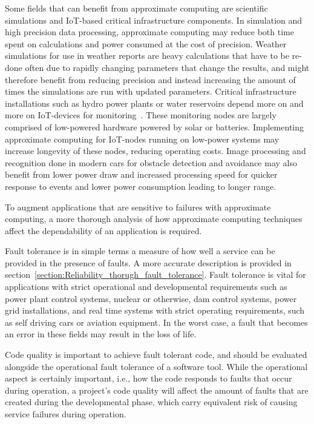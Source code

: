 Some fields that can benefit from approximate computing are scientific simulations and IoT-based critical infrastructure components. In simulation and high precision data processing, approximate computing may reduce both time spent on calculations and power consumed at the cost of precision. Weather simulations for use in weather reports are heavy calculations that have to be re-done often due to rapidly changing parameters that change the results, and might therefore benefit from reducing precision and instead increasing the amount of times the simulations are run with updated parameters. Critical infrastructure installations such as hydro power plants or water reservoirs depend more on and more on IoT-devices for monitoring~\citep{watertight_jaatun}. These monitoring nodes are largely comprised of low-powered hardware powered by solar or batteries. Implementing approximate computing for IoT-nodes running on low-power systems may increase longevity of these nodes, reducing operating costs. Image processing and recognition done in modern cars for obstacle detection and avoidance may also benefit from lower power draw and increased processing speed for quicker response to events and lower power consumption leading to longer range. %

To augment applications that are sensitive to failures with approximate computing, a more thorough analysis of how approximate computing techniques affect the dependability of an application is required.

Fault tolerance is in simple terms a measure of how well a service can be provided in the presence of faults. A more accurate description is provided in section~\ref{section:Reliability_thorugh_fault_tolerance}. Fault tolerance is vital for applications with strict operational and developmental requirements such as power plant control systems, nuclear or otherwise, dam control systems, power grid installations, and real time systems with strict operating requirements, such as self driving cars or aviation equipment. In the worst case, a fault that becomes an error in these fields may result in the loss of life. 

Code quality is important to achieve fault tolerant code, and should be evaluated alongside the operational fault tolerance of a software tool. While the operational aspect is certainly important, i.e., how the code responds to faults that occur during operation, a project's code quality will affect the amount of faults that are created during the developmental phase, which carry equivalent risk of causing service failures during operation. 

